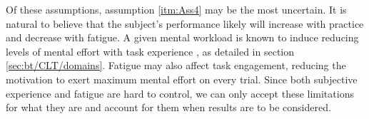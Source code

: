 \newpage
Of these assumptions, assumption \ref{itm:Ass4} may be the most uncertain. It is natural to believe that the subject's performance likely will increase with practice and decrease with fatigue. A given mental workload is known to induce reducing levels of mental effort with task experience \cite{tulga1980}, as detailed in section \ref{sec:bt/CLT/domains}. Fatigue may also affect task engagement, reducing the motivation to exert maximum mental effort on every trial. Since both subjective experience and fatigue are hard to control, we can only accept these limitations for what they are and account for them when results are to be considered.